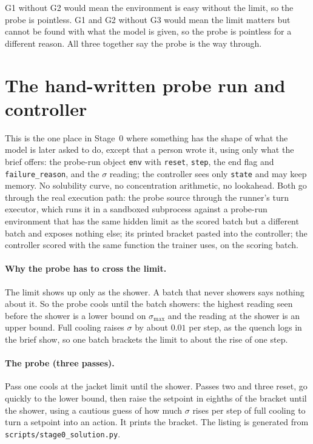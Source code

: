 \documentclass[11pt,a4paper]{article}
\newcommand{\smax}{\sigma_{\max}}
\begin{document}
G1 without G2 would mean the environment is easy without the limit, so the
probe is pointless. G1 and G2 without G3 would mean the limit matters but
cannot be found with what the model is given, so the probe is pointless for
a different reason. All three together say the probe is the way through.

\section{The hand-written probe run and controller}
\label{sec:probe}

This is the one place in Stage~0 where something has the shape of what the
model is later asked to do, except that a person wrote it, using only what
the brief offers: the probe-run object \texttt{env} with \texttt{reset},
\texttt{step}, the end flag and \texttt{failure\_reason}, and the $\sigma$
reading; the controller sees only \texttt{state} and may keep memory. No
solubility curve, no concentration arithmetic, no lookahead. Both go through
the real execution path: the probe source through the runner's turn
executor, which runs it in a sandboxed subprocess against a probe-run
environment that has the same hidden limit as the scored batch but a
different batch and exposes nothing else; its printed bracket pasted into
the controller; the controller scored with the same function the trainer
uses, on the scoring batch.

\paragraph{Why the probe has to cross the limit.} The limit shows up only as
the shower. A batch that never showers says nothing about it. So the probe
cools until the batch showers: the highest reading seen before the shower is
a lower bound on $\smax$ and the reading at the shower is an upper bound.
Full cooling raises $\sigma$ by about $0.01$ per step, as the quench logs in
the brief show, so one batch brackets the limit to about the rise of one
step.

\paragraph{The probe (three passes).} Pass one cools at the jacket limit
until the shower. Passes two and three reset, go quickly to the lower bound,
then raise the setpoint in eighths of the bracket until the shower, using a
cautious guess of how much $\sigma$ rises per step of full cooling to turn a
setpoint into an action. It prints the bracket. The listing is generated from
\texttt{scripts/stage0\_solution.py}.
\begin{scriptsize}

\end{scriptsize}
\end{document}

